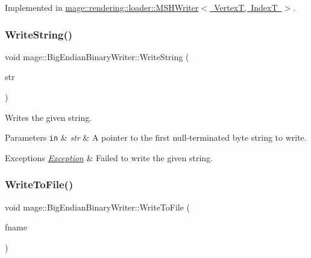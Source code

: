 Implemented in \mbox{\hyperlink{classmage_1_1rendering_1_1loader_1_1_m_s_h_writer_ad61ee7097e1bfb52ca9a0697d2cd6a7e}{mage\+::rendering\+::loader\+::\+M\+S\+H\+Writer$<$ Vertex\+T, Index\+T $>$}}.

\mbox{\label{classmage_1_1_big_endian_binary_writer_acf065a2e7462c9e6cf46849bd2c9d2e7}} 
\subsubsection{\texorpdfstring{Write\+String()}{WriteString()}}
{\footnotesize\ttfamily void mage\+::\+Big\+Endian\+Binary\+Writer\+::\+Write\+String (\begin{DoxyParamCaption}\item[{\mbox{\hyperlink{namespacemage_a8769f9d670d6b585ea306cb1062af94b}{Not\+Null}}$<$ \mbox{\hyperlink{namespacemage_abfd9206dc607ceb5d13ec68bf075a5c0}{const\+\_\+zstring}} $>$}]{str }\end{DoxyParamCaption})\hspace{0.3cm}{\ttfamily [protected]}}

Writes the given string.


\begin{DoxyParams}[1]{Parameters}
\mbox{\tt in}  & {\em str} & A pointer to the first null-\/terminated byte string to write. \\
\hline
\end{DoxyParams}

\begin{DoxyExceptions}{Exceptions}
{\em \mbox{\hyperlink{classmage_1_1_exception}{Exception}}} & Failed to write the given string. \\
\hline
\end{DoxyExceptions}
\mbox{\label{classmage_1_1_big_endian_binary_writer_a3a49f78f308a0827f4a99150ad49d7c1}} 
\subsubsection{\texorpdfstring{Write\+To\+File()}{WriteToFile()}}
{\footnotesize\ttfamily void mage\+::\+Big\+Endian\+Binary\+Writer\+::\+Write\+To\+File (\begin{DoxyParamCaption}\item[{wstring}]{fname }\end{DoxyParamCaption})}

